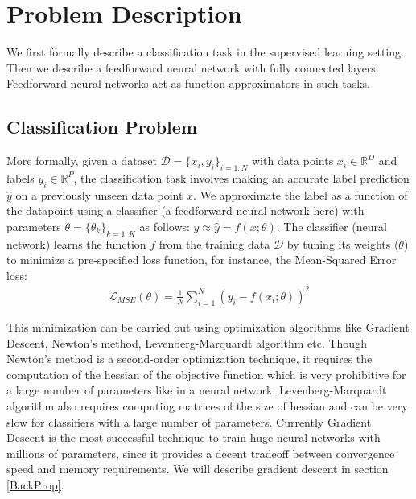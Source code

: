 \section{Problem Description}
\label{ProbDesc}

We first formally describe a classification task in the supervised learning setting. Then we describe a feedforward neural network with fully connected layers. Feedforward neural networks act as function approximators in such tasks.

\subsection{Classification Problem}
\label{ClassProb}

More formally, given a dataset $ \mathcal{D} = \{x_i,y_i\}_{i=1:N}$ with data points $x_i \in \mathbb{R}^D$ and labels $y_i \in \mathbb{R}^P$, the classification task involves making an accurate label prediction $\hat{y}$ on a previously unseen data point $x$. We approximate the label as a function of the datapoint using a classifier (a feedforward neural network here) with parameters $\theta = \{\theta_k\}_{k=1:K}$ as follows: $y \approx \hat{y} = f(x; \theta)$.
The classifier (neural network) learns the function $f$ from the training data $\mathcal{D}$ by tuning its weights ($\theta$) to minimize a pre-specified loss function, for instance, the Mean-Squared Error loss:
\begin{align}
\mathcal{L}_{MSE} (\theta) = \frac{1}{N}\sum_{i=1}^N ( y_i - f(x_i; \theta))^2
\end{align}

This minimization can be carried out using optimization algorithms like Gradient Descent, Newton's method, Levenberg-Marquardt algorithm etc.
Though Newton's method is a second-order optimization technique, it requires the computation of the hessian of the objective function which is very prohibitive for a large number of parameters like in a neural network.
Levenberg-Marquardt algorithm also requires computing matrices of the size of hessian and can be very slow for classifiers with a large number of parameters.
Currently Gradient Descent is the most successful technique to train huge neural networks with millions of parameters, since it provides a decent tradeoff between convergence speed and memory requirements.
We will describe gradient descent in section \ref{BackProp}.

